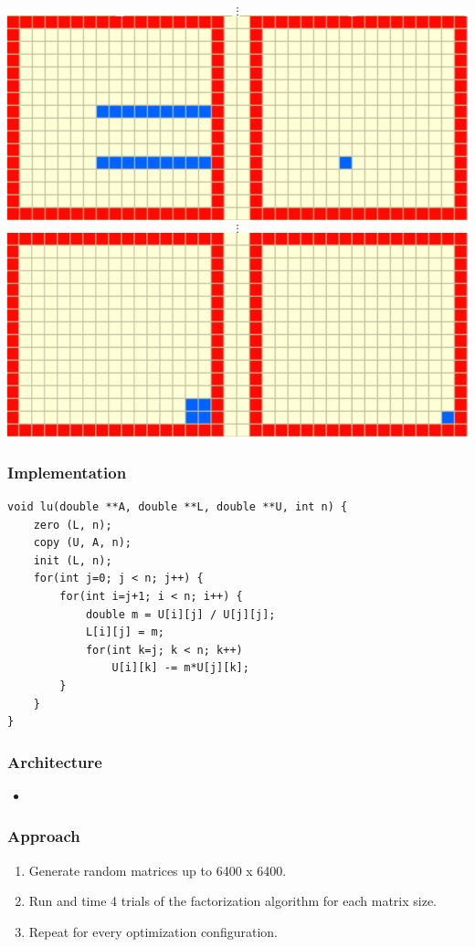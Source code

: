 \documentclass{beamer}
\begin{document}
\begin{frame}
\begin{center}
$$\vdots$$
\includegraphics[scale=0.2]{figures/lu6}
$$\vdots$$
\includegraphics[scale=0.2]{figures/lu7}
\end{center}

\end{frame}


\begin{frame}[fragile]
\frametitle{Implementation}

\begin{lstlisting}
void lu(double **A, double **L, double **U, int n) {
    zero (L, n);
    copy (U, A, n);
    init (L, n);
    for(int j=0; j < n; j++) {
        for(int i=j+1; i < n; i++) {
            double m = U[i][j] / U[j][j];
            L[i][j] = m;
            for(int k=j; k < n; k++)
                U[i][k] -= m*U[j][k];
        }
    }
}
\end{lstlisting}

\end{frame}


\begin{frame}
\frametitle{Architecture}
\begin{itemize}

\item 


\end{itemize}
\end{frame}

\begin{frame}
\frametitle{Approach}
\begin{enumerate}
\item Generate random matrices up to 6400 x 6400.
\item Run and time 4 trials of the factorization algorithm for each matrix size.
\item Repeat for every optimization configuration.
\end{enumerate}
\end{frame}
\end{document}
